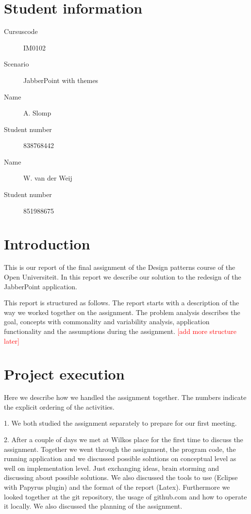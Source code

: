 \documentclass[a4paper]{article}
\newcommand{\todo}[1]{\textcolor{red}{[#1]}}
\begin{document}
\pagestyle{fancy}

\section*{Student information}
\begin{description}
	\item [Cursuscode] IM0102
	\item [Scenario] JabberPoint with themes
	\item [Name] A. Slomp
	\item [Student number] 838768442
	\item [Name] W. van der Weij
	\item [Student number] 851988675
\end{description}

\section{Introduction}
This is our report of the final assignment of the Design patterns course of the Open Universiteit. In this report we describe our solution to the redesign of the JabberPoint application.

This report is structured as follows.
The report starts with a description of the way we worked together on the assignment. 
The problem analysis describes the goal, concepts with commonality and variability analysis, application functionality and the assumptions during the assignment. \todo{add more structure later}


\section{Project execution}

Here we describe how we handled the assignment together. The numbers indicate the explicit ordering of the activities. 

1. We both studied the assignment separately to prepare for our first meeting. 

2. After a couple of days we met at Wilkos place for the first time to discuss the assignment. Together we went through the assignment, the program code, the running application and we discussed possible solutions on conceptual level as well on implementation level. Just exchanging ideas, brain storming and discussing about possible solutions. We also discussed the tools to use (Eclipse with Papyrus plugin) and the format of the report (Latex).
Furthermore we looked together at the git repository, the usage of github.com and how to operate it locally. We also discussed the planning of the assignment.  
\end{document}
